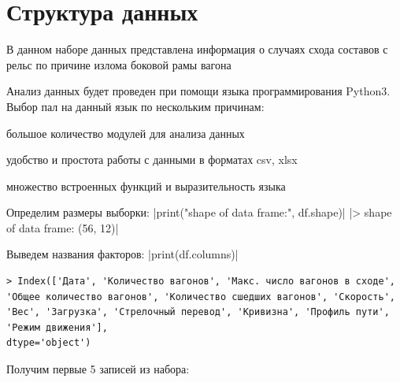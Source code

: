 \section{Структура данных}

В данном наборе данных представлена информация о случаях схода составов с рельс по причине излома боковой рамы вагона

Анализ данных будет проведен при помощи языка программирования Python3. Выбор пал на данный язык по нескольким причинам:
\begin{description}[font=$\bullet$]
\item большое количество модулей для анализа данных
\item удобство и простота работы с данными в форматах csv, xlsx
\item множество встроенных функций и выразительность языка
\end{description}

Определим размеры выборки:
|print("shape of data frame:", df.shape)|
|> shape of data frame: (56, 12)|

Выведем названия факторов:
|print(df.columns)|
\begin{verbatim}
> Index(['Дата', 'Количество вагонов', 'Макс. число вагонов в сходе',
'Общее количество вагонов', 'Количество сшедших вагонов', 'Скорость',
'Вес', 'Загрузка', 'Стрелочный перевод', 'Кривизна', 'Профиль пути',
'Режим движения'],
dtype='object')
\end{verbatim}

\begin{flushleft}
Получим первые 5 записей из набора:
\end{flushleft}
\begin{table}[h]
\label{tab:first_5_records}
\end{table}


